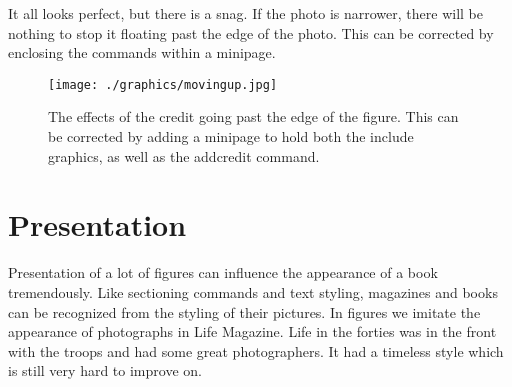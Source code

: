 It all looks perfect, but there is a snag. If the photo is narrower, there will be nothing to stop it floating past the edge of the photo. This can be corrected by enclosing the commands within a minipage.


\begin{figure}[htp]
%
\texttt{[image: ./graphics/movingup.jpg]}\par
{}%
\caption{The effects of the credit going past the edge of the figure. This can be corrected by adding a minipage to hold both the include graphics, as well as the addcredit command. }
\end{figure}

\section{Presentation}

Presentation of a lot of figures can influence the appearance of a book tremendously. Like sectioning commands and text styling, magazines and books can be recognized from the styling of their pictures. In figures we imitate the appearance of photographs in Life Magazine. Life in the forties was in the front with the troops and had some great photographers.  It had a timeless style which is still very hard to improve on.

